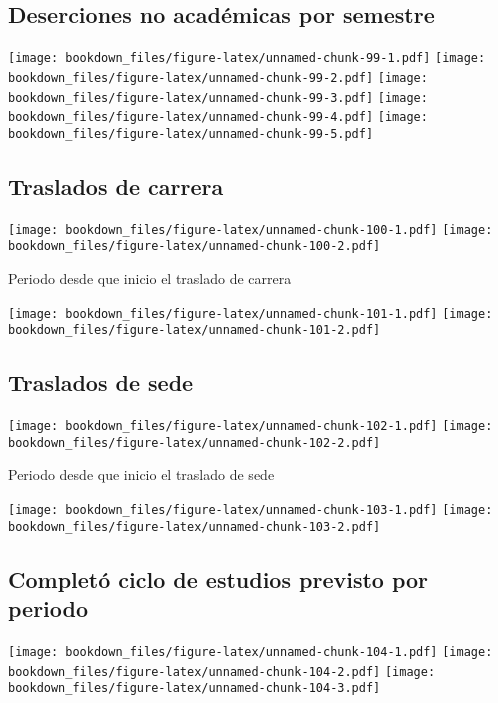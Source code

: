 \documentclass[]{article}
\theoremstyle{definition}
\theoremstyle{definition}
\theoremstyle{definition}
\theoremstyle{remark}
\begin{document}
\subsection{Deserciones no académicas por
semestre}\label{deserciones-no-academicas-por-semestre-1}

\texttt{[image: bookdown\_files/figure-latex/unnamed-chunk-99-1.pdf]}
\texttt{[image: bookdown\_files/figure-latex/unnamed-chunk-99-2.pdf]}
\texttt{[image: bookdown\_files/figure-latex/unnamed-chunk-99-3.pdf]}
\texttt{[image: bookdown\_files/figure-latex/unnamed-chunk-99-4.pdf]}
\texttt{[image: bookdown\_files/figure-latex/unnamed-chunk-99-5.pdf]}

\subsection{Traslados de carrera}\label{traslados-de-carrera-1}

\texttt{[image: bookdown\_files/figure-latex/unnamed-chunk-100-1.pdf]}
\texttt{[image: bookdown\_files/figure-latex/unnamed-chunk-100-2.pdf]}

Periodo desde que inicio el traslado de carrera

\texttt{[image: bookdown\_files/figure-latex/unnamed-chunk-101-1.pdf]}
\texttt{[image: bookdown\_files/figure-latex/unnamed-chunk-101-2.pdf]}

\subsection{Traslados de sede}\label{traslados-de-sede-1}

\texttt{[image: bookdown\_files/figure-latex/unnamed-chunk-102-1.pdf]}
\texttt{[image: bookdown\_files/figure-latex/unnamed-chunk-102-2.pdf]}

Periodo desde que inicio el traslado de sede

\texttt{[image: bookdown\_files/figure-latex/unnamed-chunk-103-1.pdf]}
\texttt{[image: bookdown\_files/figure-latex/unnamed-chunk-103-2.pdf]}

\subsection{Completó ciclo de estudios previsto por
periodo}\label{completo-ciclo-de-estudios-previsto-por-periodo-1}

\texttt{[image: bookdown\_files/figure-latex/unnamed-chunk-104-1.pdf]}
\texttt{[image: bookdown\_files/figure-latex/unnamed-chunk-104-2.pdf]}
\texttt{[image: bookdown\_files/figure-latex/unnamed-chunk-104-3.pdf]}
\end{document}
